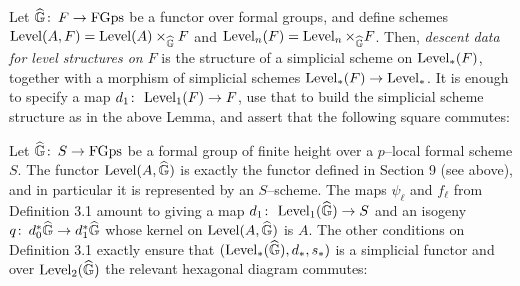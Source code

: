 \begin{definition}
Let $\widehat{\mathbb G}\colon\thinspace F \to \mathrm{FGps}$ be a functor over formal groups, and define schemes $\operatorname{Level}(A, F) = \operatorname{Level}(A) \times_{\widehat{\mathbb G}} F$ and $\operatorname{Level}_n(F) = \operatorname{Level}_n \times_{\widehat{\mathbb G}} F$.  Then, \textit{descent data for level structures on $F$} is the structure of a simplicial scheme on $\operatorname{Level}_*(F)$, together with a morphism of simplicial schemes $\operatorname{Level}_*(F) \to \operatorname{Level}_*$.  It is enough to specify a map $d_1\colon\thinspace \operatorname{Level}_1(F) \to F$, use that to build the simplicial scheme structure as in the above Lemma, and assert that the following square commutes:
\begin{center}
\end{center}
\end{definition}

\begin{example}
Let $\widehat{\mathbb G}\colon\thinspace S \to \mathrm{FGps}$ be a formal group of finite height over a $p$--local formal scheme $S$.  The functor $\operatorname{Level}(A, \widehat{\mathbb G})$ is exactly the functor defined in Section 9 (see above), and in particular it is represented by an $S$--scheme.  The maps $\psi_\ell$ and $f_\ell$ from Definition 3.1 amount to giving a map $d_1\colon\thinspace \operatorname{Level}_1(\widehat{\mathbb G}) \to S$ and an isogeny $q\colon\thinspace d_0^* \widehat{\mathbb G} \to d_1^* \widehat{\mathbb G}$ whose kernel on $\operatorname{Level}(A, \widehat{\mathbb G})$ is $A$.  The other conditions on Definition 3.1 exactly ensure that $(\operatorname{Level}_*(\widehat{\mathbb G}), d_*, s_*)$ is a simplicial functor and over $\operatorname{Level}_2(\widehat{\mathbb G})$ the relevant hexagonal diagram commutes:
\begin{center}
\end{center}
\end{example}


